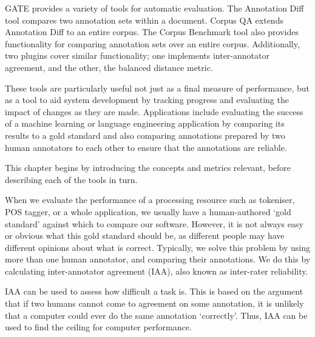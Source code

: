 GATE provides a variety of tools for automatic evaluation. The Annotation Diff
tool compares two annotation sets within a document. Corpus QA extends Annotation
Diff to an entire corpus. The Corpus Benchmark tool also provides
functionality for comparing annotation sets over an entire corpus. Additionally,
two plugins cover similar functionality; one implements inter-annotator
agreement, and the other, the balanced distance metric.

These tools are particularly useful not just as a final measure of performance,
but as a tool to aid system development by tracking progress and evaluating the
impact of changes as they are made. Applications include evaluating the success
of a machine learning or language engineering application by comparing its
results to a gold standard and also comparing annotations prepared by two
human annotators to each other to ensure that the annotations are reliable.

This chapter begins by introducing the concepts and metrics relevant, before
describing each of the tools in turn.



When we evaluate the performance of a processing resource such as tokeniser, POS
tagger, or a whole application, we usually have a human-authored `gold standard'
against which to compare our software. However, it is not always easy or obvious
what this gold standard should be, as different people may have different
opinions about what is correct. Typically, we solve this problem by using more
than one human annotator, and comparing their annotations. We do this by
calculating inter-annotator agreement (IAA), also known as inter-rater reliability.

IAA can be used to assess how difficult a task is. This is based on the argument
that if two humans cannot come to agreement on some annotation, it is unlikely
that a computer could ever do the same annotation `correctly'. Thus, IAA can be
used to find the ceiling for computer performance.

